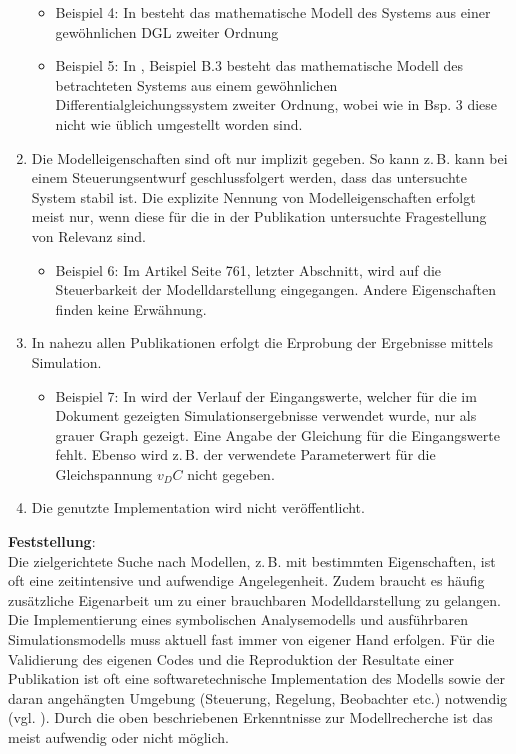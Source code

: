 \begin{enumerate}
\begin{itemize}[label=$\bullet$]
		\item Beispiel 4: In \cite[Seite 3]{BUT21} besteht das mathematische Modell des Systems aus einer gewöhnlichen DGL zweiter Ordnung
		\item Beispiel 5: In \cite[Seite 168f]{KNO16}, Beispiel B.3 besteht das mathematische Modell des betrachteten Systems aus einem gewöhnlichen Differentialgleichungssystem zweiter Ordnung, wobei wie in Bsp. 3 diese nicht wie üblich umgestellt worden sind.
	\end{itemize}
	\item  Die Modelleigenschaften sind oft nur implizit gegeben. So kann z.\,B. kann bei einem Steuerungsentwurf geschlussfolgert werden, dass das untersuchte System stabil ist. Die explizite Nennung von Modelleigenschaften erfolgt meist nur, wenn diese für die in der Publikation untersuchte Fragestellung von Relevanz sind. 
	\begin{itemize}[label=$\bullet$]
		\item Beispiel 6: Im Artikel \cite{PEGUEA16} Seite 761, letzter Abschnitt, wird auf die Steuerbarkeit der Modelldarstellung eingegangen. Andere Eigenschaften finden keine Erwähnung.
	\end{itemize}
	\item In nahezu allen Publikationen erfolgt die Erprobung der Ergebnisse mittels Simulation. 
	\begin{itemize}[label=$\bullet$]
		\item Beispiel 7: In \cite{BUT21} wird der Verlauf der Eingangswerte, welcher für die im Dokument gezeigten Simulationsergebnisse verwendet wurde, nur als grauer Graph gezeigt. Eine Angabe der Gleichung für die Eingangswerte fehlt. Ebenso wird z.\,B. der verwendete Parameterwert für die Gleichspannung $v_DC$ nicht gegeben.
	\end{itemize}
	\item Die genutzte Implementation wird nicht veröffentlicht.
\end{enumerate}

\textbf{Feststellung}:\\
Die zielgerichtete Suche nach Modellen, z.\,B. mit bestimmten Eigenschaften, ist oft eine zeitintensive und aufwendige Angelegenheit. Zudem braucht es häufig zusätzliche Eigenarbeit um zu einer brauchbaren Modelldarstellung zu gelangen. Die Implementierung eines symbolischen Analysemodells und ausführbaren Simulationsmodells muss aktuell fast immer von eigener Hand erfolgen. Für die Validierung des eigenen Codes und die Reproduktion der Resultate einer Publikation ist oft eine softwaretechnische Implementation des Modells sowie der daran angehängten Umgebung (Steuerung, Regelung, Beobachter etc.) notwendig (vgl. \cite[S. 1]{KNHE20b}). Durch die oben beschriebenen Erkenntnisse zur Modellrecherche ist das meist aufwendig oder nicht möglich.

